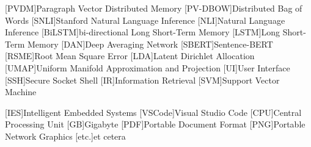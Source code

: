 \begin{acronym}[XXXXXXXXX]
    [PVDM]{Paragraph Vector Distributed Memory}
    [PV-DBOW]{Distributed Bag of Words}
    [SNLI]{Stanford Natural Language Inference}
    [NLI]{Natural Language Inference}
    [BiLSTM]{bi-directional Long Short-Term Memory}
    [LSTM]{Long Short-Term Memory}
    [DAN]{Deep Averaging Network}
    [SBERT]{Sentence-BERT}
    [RSME]{Root Mean Square Error}
    [LDA]{Latent Dirichlet Allocation}
    [UMAP]{Uniform Manifold Approximation and Projection}
    [UI]{User Interface}
    [SSH]{Secure Socket Shell}
    [IR]{Information Retrieval}
    [SVM]{Support Vector Machine}


    \vspace{\parskip}
    [IES]{Intelligent Embedded Systems}
    [VSCode]{Visual Studio Code}
    [CPU]{Central Processing Unit}
    [GB]{Gigabyte}
    [PDF]{Portable Document Format}
    [PNG]{Portable Network Graphics}
    [etc.]{et cetera}

\end{acronym}
